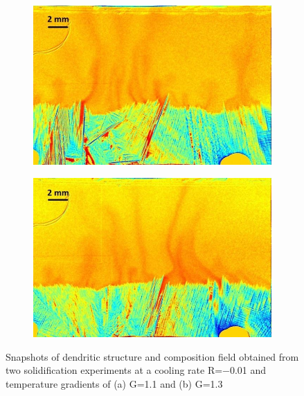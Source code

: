 \begin{figure}[htbp]
\centering
  \begin{subfigure}{0.4\textwidth}
    \centering
	\includegraphics[width=\textwidth]{Chapter4/Graphics/freckle_exp/lowgrad.png}
	\caption{}
    \label{fig:exp_lowgrad}
  \end{subfigure}
  \begin{subfigure}{0.4\textwidth}
    \centering
	\includegraphics[width=\textwidth]{Chapter4/Graphics/freckle_exp/highgrad.png}
	\caption{}
    \label{fig:exp_highgrad}
  \end{subfigure}
\caption{Snapshots of dendritic structure and composition field 
obtained from two solidification experiments at a cooling rate 
R=\SI{-0.01}{\uCR} and temperature gradients of (a) G=\SI{1.1}{\ugradT} and (b) G=\SI{1.3}{\ugradT}} 
\label{fig:experimental_freckles_gradients}
\end{figure}


